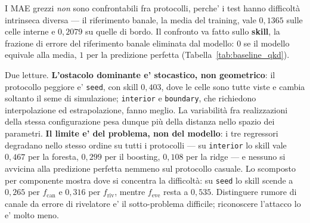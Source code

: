 \documentclass[10pt,conference,a4paper,twocolumn]{IEEEtran}
\begin{document}
I MAE grezzi \emph{non} sono confrontabili fra protocolli, perche' i test hanno difficoltà intrinseca diversa — il riferimento banale, la media del training, vale $0{,}1365$ sulle celle interne e $0{,}2079$ su quelle di bordo. Il confronto va fatto sullo \textbf{skill}, la frazione di errore del riferimento banale eliminata dal modello: $0$ se il modello equivale alla media, $1$ per la predizione perfetta (Tabella~\ref{tab:baseline_qkd}).

\begin{table}[htbp]
    \caption{Attributore classico (Random Forest) sui quattro protocolli,
        griglia da 94.170 finestre. Lo skill è la frazione di errore del
        riferimento banale eliminata dal modello.}
    \label{tab:baseline_qkd}
    \centering
    \setlength{\tabcolsep}{3pt}
\end{table}

Due letture. \textbf{L'ostacolo dominante e' stocastico, non geometrico}: il protocollo peggiore e' \texttt{seed}, con skill $0{,}403$, dove le celle sono tutte viste e cambia soltanto il seme di simulazione; \texttt{interior} e \texttt{boundary}, che richiedono interpolazione ed estrapolazione, fanno meglio. La variabilità fra realizzazioni della stessa configurazione pesa dunque più della distanza nello spazio dei parametri. \textbf{Il limite e' del problema, non del modello}: i tre regressori degradano nello stesso ordine su tutti i protocolli — su \texttt{interior} lo skill vale $0{,}467$ per la foresta, $0{,}299$ per il boosting, $0{,}108$ per la ridge — e nessuno si avvicina alla predizione perfetta nemmeno sul protocollo casuale. Lo scomposto per componente mostra dove si concentra la difficoltà: su \texttt{seed} lo skill scende a $0{,}265$ per $f_{\text{can}}$ e $0{,}316$ per $f_{\text{riv}}$, mentre $f_{\text{eve}}$ resta a $0{,}535$. Distinguere rumore di canale da errore di rivelatore e' il sotto-problema difficile; riconoscere l'attacco lo e' molto meno.
\end{document}

